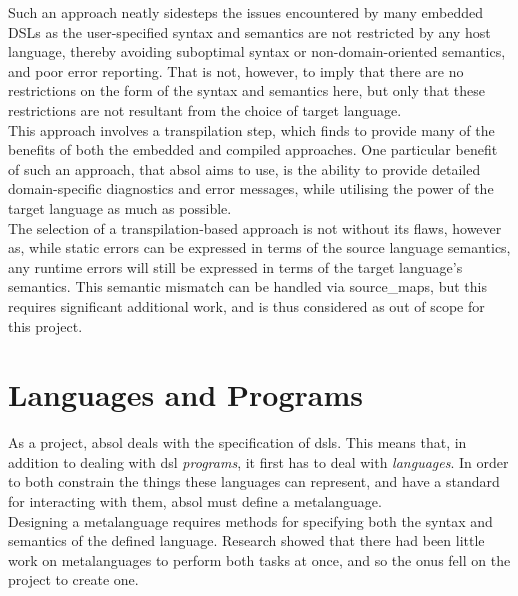 Such an approach neatly sidesteps the issues encountered by many embedded DSLs as the user-specified syntax and semantics are not restricted by any host language, thereby avoiding suboptimal syntax or non-domain-oriented semantics, and poor error reporting.
That is not, however, to imply that there are no restrictions on the form of the syntax and semantics here, but only that these restrictions are not resultant from the choice of target language. \\

This approach involves a \gls{transpilation} step, which \citet{kulkarnitranspiler} finds to provide many of the benefits of both the embedded and compiled approaches. 
One particular benefit of such an approach, that \gls{absol} aims to use, is the ability to provide detailed domain-specific diagnostics and error messages, while utilising the power of the target language as much as possible.\\

The selection of a transpilation-based approach is not without its flaws, however as, while static errors can be expressed in terms of the source language semantics, any runtime errors will still be expressed in terms of the target language's semantics. 
This semantic mismatch can be handled via \glspl{source_map}, but this requires significant additional work, and is thus considered as out of scope for this project. 



\section{Languages and Programs} %
\label{sec:languages_and_programs}
As a project, \gls{absol} deals with the specification of \glspl{dsl}. 
This means that, in addition to dealing with \gls{dsl} \textit{programs}, it first has to deal with \textit{languages}. 
In order to both constrain the things these languages can represent, and have a standard for interacting with them, \gls{absol} must define a metalanguage. \\

Designing a metalanguage requires methods for specifying both the syntax and semantics of the defined language.
Research showed that there had been little work on metalanguages to perform both tasks at once, and so the onus fell on the project to create one. 

